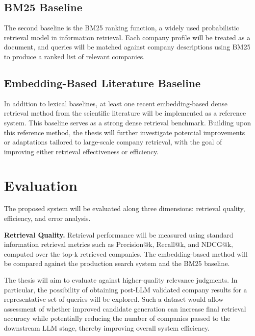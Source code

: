 \documentclass[a4paper]{scrartcl}
\begin{document}
\subsection{BM25 Baseline}

The second baseline is the BM25 ranking function, a widely used probabilistic retrieval model in information retrieval. Each company profile will be treated as a document, and queries will be matched against company descriptions using BM25 to produce a ranked list of relevant companies. %

\subsection{Embedding-Based Literature Baseline}

In addition to lexical baselines, at least one recent embedding-based dense retrieval method from the scientific literature will be implemented as a reference system. This baseline serves as a strong dense retrieval benchmark. Building upon this reference method, the thesis will further investigate potential improvements or adaptations tailored to large-scale company retrieval, with the goal of improving either retrieval effectiveness or efficiency.

\section{Evaluation}

The proposed system will be evaluated along three dimensions: retrieval quality, efficiency, and error analysis.

\textbf{Retrieval Quality.}
Retrieval performance will be measured using standard information retrieval metrics such as Precision@k, Recall@k, and NDCG@k, computed over the top-k retrieved companies. The embedding-based method will be compared against the production search system and the BM25 baseline. 

The thesis will aim to evaluate against higher-quality relevance judgments. In particular, the possibility of obtaining post-LLM validated company results for a representative set of queries will be explored. Such a dataset would allow assessment of whether improved candidate generation can increase final retrieval accuracy while potentially reducing the number of companies passed to the downstream LLM stage, thereby improving overall system efficiency.
\end{document}
